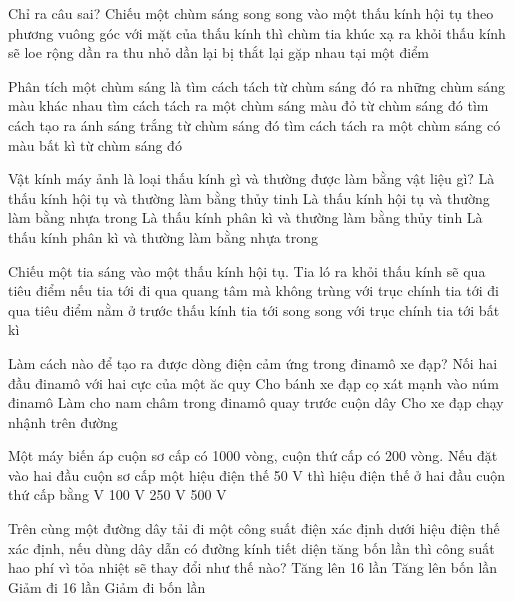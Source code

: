 \begin{ex}
	Chỉ ra câu sai?
	Chiếu một chùm sáng song song vào một thấu kính hội tụ theo phương vuông góc với mặt của thấu kính thì chùm tia khúc xạ ra khỏi thấu kính sẽ
	\choice
	{\True loe rộng dần ra}
	{thu nhỏ dần lại}
	{bị thắt lại}
	{gặp nhau tại một điểm}
	\loigiai{}
\end{ex}
\begin{ex}
	Phân tích một chùm sáng là
	\choice
	{\True tìm cách tách từ chùm sáng đó ra những chùm sáng màu khác nhau}
	{tìm cách tách ra một chùm sáng màu đỏ từ chùm sáng đó}
	{tìm cách tạo ra ánh sáng trắng từ chùm sáng đó}
	{tìm cách tách ra một chùm sáng có màu bất kì từ chùm sáng đó}
	\loigiai{}
\end{ex}

\begin{ex}
	Vật kính máy ảnh là loại thấu kính gì và thường được làm bằng vật liệu gì?
	\choice
	{\True Là thấu kính hội tụ và thường làm bằng thủy tinh}
	{Là thấu kính hội tụ và thường làm bằng nhựa trong}
	{Là thấu kính phân kì và thường làm bằng thủy tinh}
	{Là thấu kính phân kì và thường làm bằng nhựa trong}
	\loigiai{}
\end{ex}
\begin{ex}
	Chiếu một tia sáng vào một thấu kính hội tụ. Tia ló ra khỏi thấu kính sẽ qua tiêu điểm nếu
	\choice
	{tia tới đi qua quang tâm mà không trùng với trục chính}
	{tia tới đi qua tiêu điểm nằm ở trước thấu kính}
	{\True tia tới song song với trục chính}
	{tia tới bất kì}
	\loigiai{}
\end{ex}
\begin{ex}
	Làm cách nào để tạo ra được dòng điện cảm ứng trong đinamô xe đạp?
	\choice
	{Nối hai đầu đinamô với hai cực của một ăc quy}
	{Cho bánh xe đạp cọ xát mạnh vào núm đinamô}
	{\True Làm cho nam châm trong đinamô quay trước cuộn dây}
	{Cho xe đạp chạy nhậnh trên đường}
	\loigiai{}
\end{ex}
\begin{ex}
	Một máy biến áp cuộn sơ cấp có 1000 vòng, cuộn thứ cấp có 200 vòng. Nếu đặt vào hai đầu cuộn sơ cấp một hiệu điện thế 50 V thì hiệu điện thế ở hai đầu cuộn thứ cấp bằng
	\choice
	{ V}
	{100 V}
	{250 V}
	{500 V}
	\loigiai{}
\end{ex}
\begin{ex}
	Trên cùng một đường dây tải đi một công suất điện xác định dưới hiệu điện thế xác định, nếu dùng dây dẫn có đường kính tiết diện tăng bốn lần thì công suất hao phí vì tỏa nhiệt sẽ thay đổi như thế nào?
	\choice
	{Tăng lên 16 lần}
	{Tăng lên bốn lần}
	{\True Giảm đi 16 lần}
	{Giảm đi bốn lần}
	\loigiai{}
\end{ex}
